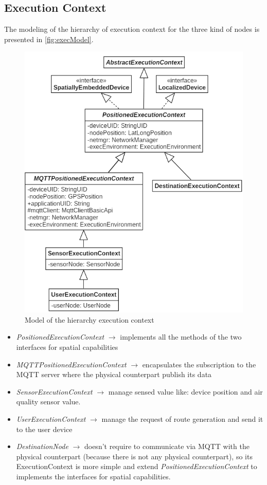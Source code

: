\subsection{Execution Context}
The modeling of the hierarchy of execution context for the three kind of nodes is presented in \autoref{fig:execModel}.

\begin{figure}[h]
    \centering
    \includegraphics[scale=0.9]{images/execContextModel_v4.png}
    \caption{Model of the hierarchy execution context}
    \label{fig:execModel}
\end{figure}

\begin{itemize}
    \item \textit{PositionedExecutionContext} $\rightarrow$ implements all the methods of the two interfaces for spatial capabilities
    \item \textit{MQTTPositionedExecutionContext} $\rightarrow$ encapsulates the subscription to the MQTT server where the physical counterpart publish its data
    \item \textit{SensorExecutionContext} $\rightarrow$ manage sensed value like: device position and air quality sensor value. 
    \item \textit{UserExecutionContext} $\rightarrow$ manage the request of route generation and send it to the user device
    \item \textit{DestinationNode} $\rightarrow$ doesn't require to communicate via MQTT with the physical counterpart (because there is not any physical counterpart), so its ExecutionContext is more simple and extend \mbox{\textit{PositionedExecutionContext}} to implements the interfaces for spatial capabilities.
\end{itemize}

